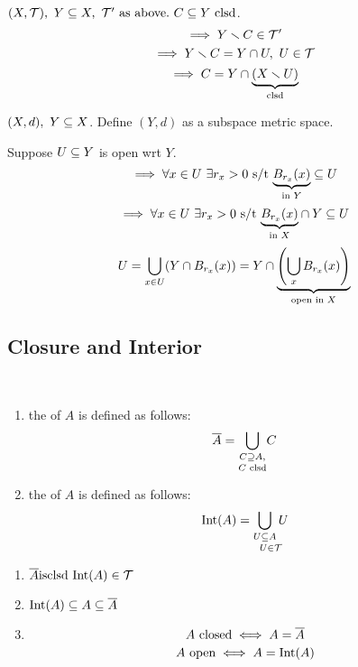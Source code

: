 \documentclass[12pt]{article}
\begin{document}
\bboxnote
\begin{note}
  \((X,\TT),\ Y\ssq X,\ \TT'\T{ as above}.\ C\ssq Y\T{ clsd}\).
  \[
  \implies Y\smallsetminus C \in \mathcal T'
  \]
  \[
  \implies Y\smallsetminus C=Y\cap U,\ U\in\mathcal T
  \]
  \[
  \implies C = Y \cap \underset{\text{clsd}}{\underbrace{(X\smallsetminus U)}}
  \]
\end{note}
\ebox

\bboxnote
\begin{note}
    \((X,d),\ Y\subseteq X\). Define \((Y,d)\) as a subspace metric space.

    Suppose \(U\subseteq Y\) is open wrt \(Y\).
    \[
        \implies \forall x\in U\ \exists r_x>0\text{ s/t }
        \underset{\text{in }Y}{\underbrace{B_{r_x}(x)}}\subseteq U
    \]
    \[
        \implies \forall x\in U\ \exists r_x>0\text{ s/t }
        \underset{\text{in }X}{\underbrace{
                B_{r_x}(x)
        }} \cap Y \subseteq U
    \]
    \[
        U=\bigcup_{x\in U}(Y\cap B_{r_x}(x))
        =Y\cap\underset{\text{open in }X}{\underbrace{
                \left(
                    \bigcup_xB_{r_x}(x)
                    \right)
        }}
    \]
\end{note}
\ebox

\subsection{Closure and Interior}
\bboxdefn
\begin{defn}\ 
    \begin{enumerate}
        \item the  of \(A\) is defined as follows:
            \[
                \overline{A}=\underset{C\text{ clsd}}{\bigcup_{C\supseteq A,}}C
            \]
        \item the  of \(A\) is defined as follows:
            \[
                \mathrm{Int}(A)=\underset{U\in\mathcal T}{
                    \bigcup_{U\subseteq A} U
                }
            \]
    \end{enumerate}
\end{defn}
\ebox

\bboxnote
\begin{note}
    \begin{enumerate}
        \item \(\cls A\is\T{clsd}\ \interior(A)\in\TT\)
        \item \(\mathrm{Int}(A)\subseteq A\subseteq\overline{A}\)
        \item 
            \[
                A\text{ closed}\iff A=\overline{A}
            \] \[
                A\text{ open}\iff A=\mathrm{Int}(A)
            \]
    \end{enumerate}
\end{note}
\ebox
\end{document}
